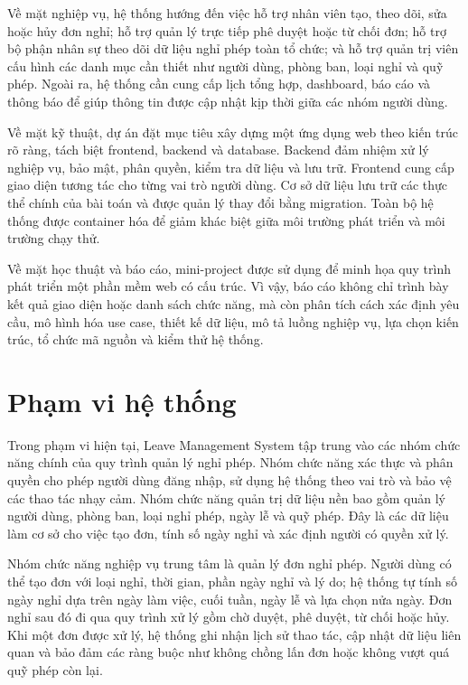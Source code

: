 Về mặt nghiệp vụ, hệ thống hướng đến việc hỗ trợ nhân viên tạo, theo dõi, sửa hoặc hủy đơn nghỉ; hỗ trợ quản lý trực tiếp phê duyệt hoặc từ chối đơn; hỗ trợ bộ phận nhân sự theo dõi dữ liệu nghỉ phép toàn tổ chức; và hỗ trợ quản trị viên cấu hình các danh mục cần thiết như người dùng, phòng ban, loại nghỉ và quỹ phép. Ngoài ra, hệ thống cần cung cấp lịch tổng hợp, dashboard, báo cáo và thông báo để giúp thông tin được cập nhật kịp thời giữa các nhóm người dùng.

Về mặt kỹ thuật, dự án đặt mục tiêu xây dựng một ứng dụng web theo kiến trúc rõ ràng, tách biệt frontend, backend và database. Backend đảm nhiệm xử lý nghiệp vụ, bảo mật, phân quyền, kiểm tra dữ liệu và lưu trữ. Frontend cung cấp giao diện tương tác cho từng vai trò người dùng. Cơ sở dữ liệu lưu trữ các thực thể chính của bài toán và được quản lý thay đổi bằng migration. Toàn bộ hệ thống được container hóa để giảm khác biệt giữa môi trường phát triển và môi trường chạy thử.

Về mặt học thuật và báo cáo, mini-project được sử dụng để minh họa quy trình phát triển một phần mềm web có cấu trúc. Vì vậy, báo cáo không chỉ trình bày kết quả giao diện hoặc danh sách chức năng, mà còn phân tích cách xác định yêu cầu, mô hình hóa use case, thiết kế dữ liệu, mô tả luồng nghiệp vụ, lựa chọn kiến trúc, tổ chức mã nguồn và kiểm thử hệ thống.

\section{Phạm vi hệ thống}
Trong phạm vi hiện tại, Leave Management System tập trung vào các nhóm chức năng chính của quy trình quản lý nghỉ phép. Nhóm chức năng xác thực và phân quyền cho phép người dùng đăng nhập, sử dụng hệ thống theo vai trò và bảo vệ các thao tác nhạy cảm. Nhóm chức năng quản trị dữ liệu nền bao gồm quản lý người dùng, phòng ban, loại nghỉ phép, ngày lễ và quỹ phép. Đây là các dữ liệu làm cơ sở cho việc tạo đơn, tính số ngày nghỉ và xác định người có quyền xử lý.

Nhóm chức năng nghiệp vụ trung tâm là quản lý đơn nghỉ phép. Người dùng có thể tạo đơn với loại nghỉ, thời gian, phần ngày nghỉ và lý do; hệ thống tự tính số ngày nghỉ dựa trên ngày làm việc, cuối tuần, ngày lễ và lựa chọn nửa ngày. Đơn nghỉ sau đó đi qua quy trình xử lý gồm chờ duyệt, phê duyệt, từ chối hoặc hủy. Khi một đơn được xử lý, hệ thống ghi nhận lịch sử thao tác, cập nhật dữ liệu liên quan và bảo đảm các ràng buộc như không chồng lấn đơn hoặc không vượt quá quỹ phép còn lại.

